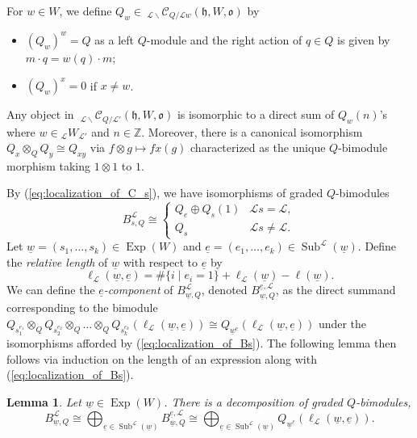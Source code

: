 \documentclass{amsart}
\newcommand{\Z}{\mathbb{Z}}
\newcommand{\scrL}{\mathcal{L}}
\newcommand{\fr}[1]{\mathfrak{#1}}
\newcommand{\CmonQ}[2]{\:_{#1 \backslash} \mathcal{C}_{Q / #2} }
\DeclareMathOperator{\Exp}{Exp}
\DeclareMathOperator{\Subexp}{Sub}
\newcommand{\W}[2]{{}_{#1}W_{#2}}
\newcommand{\ue}{\underline{e}}
\newcommand{\uw}{\underline{w}}
\newtheorem{lemma}[subsubsection]{Lemma}
\theoremstyle{definition}
\numberwithin{equation}{subsection}
\begin{document}
For $w \in W$, we define $Q_w \in \CmonQ{\scrL}{\scrL w} (\fr{h}, W, \fr{o})$ by 
\begin{itemize}
    \item $(Q_w)^w = Q$ as a left $Q$-module and the right action of $q \in Q$ is given by $m \cdot q = w(q) \cdot m$;
    \item $(Q_w)^x = 0$ if $x \neq w$.
\end{itemize}
Any object in $\CmonQ{\scrL}{\scrL'} (\fr{h}, W, \fr{o})$ is isomorphic to a direct sum of $Q_w (n)$'s where $w \in \W{\scrL}{\scrL'}$ and $n \in \Z$. Moreover, there is a canonical isomorphism $Q_x \otimes_Q Q_y \cong Q_{xy}$ via $f \otimes g \mapsto f x(g)$ characterized as the unique $Q$-bimodule morphism taking $1 \otimes 1$ to $1$.
 
By (\ref{eq:localization_of_C_s}), we have isomorphisms of graded $Q$-bimodules
\begin{equation}\label{eq:localization_of_Bs}
    B_{s, Q}^{\scrL} \cong \begin{cases} Q_e \oplus Q_s (1) & \scrL s = \scrL, \\ Q_s & \scrL s \neq \scrL.\end{cases}
\end{equation}
Let $\uw = (s_1, \ldots, s_k) \in \Exp (W)$ and $\ue = (e_1, \ldots, e_k) \in \Subexp^{\scrL} (\uw)$. Define the \emph{relative length} of $\uw$ with respect to $\ue$ by
\[\ell_{\scrL} (\uw, \ue) = \# \{i \mid e_i = 1\} + \ell_{\scrL} (\uw) - \ell (\uw).\] 
We can define the \emph{$\ue$-component} of $B_{\uw, Q}^{\scrL}$, denoted $B_{\uw, Q}^{\ue, \scrL}$, as the direct summand corresponding to the bimodule 
$Q_{s_1^{e_1}} \otimes_Q Q_{s_2^{e_2}} \otimes_Q \ldots \otimes_Q Q_{s_k^{e_k}} (\ell_{\scrL} (\uw, \ue))\cong Q_{\uw^{\ue}} (\ell_{\scrL} (\uw, \ue))$ under the isomorphisms afforded by (\ref{eq:localization_of_Bs}).
The following lemma then follows via induction on the length of an expression along with (\ref{eq:localization_of_Bs}).

\begin{lemma}\label{lem:localization_of_BS_bimods}
    Let $\uw \in \Exp (W)$. There is a decomposition of graded $Q$-bimodules,
    \[B_{\uw, Q}^{\scrL} \cong \bigoplus_{\ue \in \Subexp^{\scrL} (\uw)} B_{\uw, Q}^{\ue, \scrL} \cong \bigoplus_{\ue \in \Subexp^{\scrL} (\uw)} Q_{\uw^{\ue}} (\ell_{\scrL} (\uw, \ue)).\]
\end{lemma}
\end{document}
